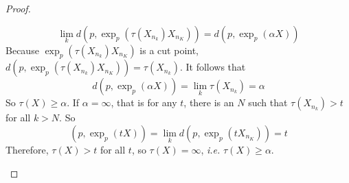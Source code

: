 \begin{enumerate}[label=\arabic{*}.]
\begin{proof}
\begin{enumerate}[label=\Roman*.]
			\begin{equation*}
				\lim_k d(p,\exp_p(\tau(X_{n_k})X_{n_K})) = d(p,\exp_p(\alpha X))
			\end{equation*}
			Because $\exp_p(\tau(X_{n_k})X_{n_K})$ is a cut point, $d(p,\exp_p(\tau(X_{n_k})X_{n_K})) = \tau(X_{n_k})$. It follows that
			\begin{equation*}
				d(p,\exp_p(\alpha X)) = \lim_k \tau(X_{n_k}) = \alpha
			\end{equation*}
			So $\tau(X) \geq \alpha$. If $\alpha = \infty$, that is for any $t$, there is an $N$ such that $\tau(X_{n_k}) > t$ for all $k > N$. So
			\begin{equation*}
				(p,\exp_p(t X)) = \lim_k d(p,\exp_p(tX_{n_K})) = t
			\end{equation*}
			Therefore, $\tau(X) > t$ for all $t$, so $\tau(X) = \infty$, \emph{i.e.} $\tau(X) \geq \alpha$.


\end{enumerate}
\end{proof}
\end{enumerate}
